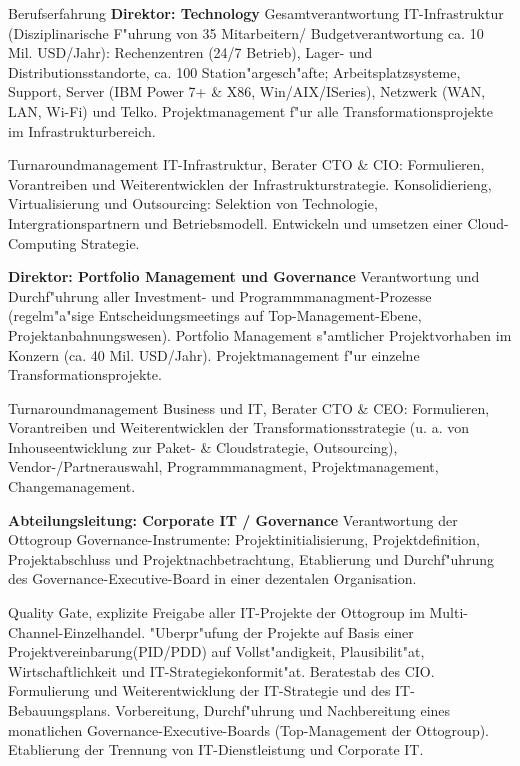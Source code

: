 \begin{rubric}{Berufserfahrung}
\entry*[04/2013 - heute] \textbf{Direktor: Technology}\newline
{} 
Gesamtverantwortung IT-Infrastruktur (Disziplinarische F"uhrung von 35 Mitarbeitern/ Budgetverantwortung ca. 10 Mil. USD/Jahr): Rechenzentren (24/7 Betrieb), Lager- und Distributionsstandorte, ca. 100 Station"argesch"afte; Arbeitsplatzsysteme, Support, Server (IBM Power 7+ \& X86, Win/AIX/ISeries), Netzwerk (WAN, LAN, Wi-Fi) und Telko. Projektmanagement f"ur alle Transformationsprojekte im Infrastrukturbereich.

Turnaroundmanagement IT-Infrastruktur, Berater CTO \& CIO: Formulieren, Vorantreiben und Weiterentwicklen der Infrastrukturstrategie. Konsolidierieng, Virtualisierung und Outsourcing: Selektion von Technologie, Intergrationspartnern und Betriebsmodell. Entwickeln und umsetzen einer Cloud-Computing Strategie.

\entry*[10/2011 - 03/2013] \textbf{Direktor: Portfolio Management und Governance}\newline
{} 
Verantwortung und Durchf"uhrung aller Investment- und Programmmanagment-Prozesse (regelm"a"sige Entscheidungsmeetings auf Top-Management-Ebene, Projektanbahnungswesen). Portfolio Management s"amtlicher Projektvorhaben im Konzern (ca. 40 Mil. USD/Jahr). Projektmanagement f"ur einzelne Transformationsprojekte.\axelvspace

Turnaroundmanagement Business und IT, Berater CTO \& CEO: Formulieren, Vorantreiben und Weiterentwicklen der Transformationsstrategie (u. a. von Inhouseentwicklung zur Paket- \& Cloudstrategie, Outsourcing), Vendor-/Partnerauswahl, Programmmanagment, Projektmanagement, Changemanagement.\newline

\pagebreak
{}
\entry*[08/2009 - 10/2011] \textbf{Abteilungsleitung: Corporate IT / Governance}\newline
{} 
Verantwortung der Ottogroup Governance-Instrumente: Projektinitialisierung, Projektdefinition, Projektabschluss und Projektnachbetrachtung, Etablierung und Durchf"uhrung des Governance-Executive-Board in einer dezentalen Organisation.\axelvspace

Quality Gate, explizite Freigabe aller IT-Projekte der Ottogroup im Multi-Channel-Einzelhandel. "Uberpr"ufung der Projekte auf Basis einer Projektvereinbarung(PID/PDD) auf Vollst"andigkeit, Plausibilit"at, Wirtschaftlichkeit und IT-Strategiekonformit"at. Beratestab des CIO. Formulierung und Weiterentwicklung der IT-Strategie und des IT-Bebauungsplans. Vorbereitung, Durchf"uhrung und Nachbereitung eines monatlichen Governance-Executive-Boards (Top-Management der Ottogroup). Etablierung der Trennung von IT-Dienstleistung und Corporate IT.


\end{rubric}
